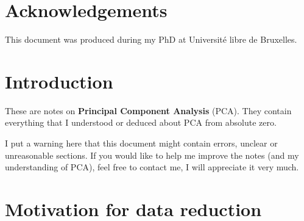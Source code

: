 \documentclass[10pt,twocolumn]{article}
\begin{document}

\vspace{10mm}

\setlength{\parindent}{0cm}

\section*{Acknowledgements}

This document was produced during my PhD at Université libre de Bruxelles.

\section{Introduction}

These are notes on \textbf{Principal Component Analysis} (PCA). They contain everything that I understood or deduced about PCA from absolute zero.

I put a warning here that this document might contain errors, unclear or unreasonable sections. If you would like to help me improve the notes (and my understanding of PCA), feel free to contact me, I will appreciate it very much.

\section{Motivation for data reduction}
\end{document}
